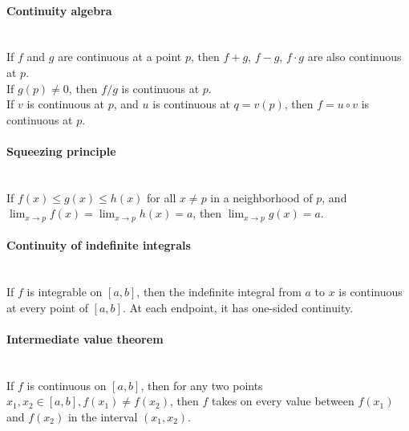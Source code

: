 \documentclass[10pt]{article}
\begin{document}
\paragraph{Continuity algebra}\ \\
If $f$ and $g$ are continuous at a point $p$, then $f + g$, $f - g$, $f \cdot g$ are also continuous at $p$.\\
If $g(p) \neq 0$, then $f/g$ is continuous at $p$.\\
If $v$ is continuous at $p$, and $u$ is continuous at $q = v(p)$,
then $f = u \circ v$ is continuous at $p$.

\paragraph{Squeezing principle}\ \\
If $f(x) \leq g(x) \leq h(x)$ for all $x \neq p$ in a neighborhood of $p$,
and $\lim_{x \to p} f(x) = \lim_{x \to p} h(x) = a$,
then $\lim_{x \to p} g(x) = a$.

\paragraph{Continuity of indefinite integrals}\ \\
If $f$ is integrable on $[a, b]$, then the indefinite integral from $a$ to $x$ is 
continuous at every point of $[a, b]$.  At each endpoint, it has one-sided continuity.

\paragraph{Intermediate value theorem}\ \\
If $f$ is continuous on $[a, b]$, then for any two points $x_1, x_2 \in [a, b], f(x_1) \neq f(x_2)$,
then $f$ takes on every value between $f(x_1)$ and $f(x_2)$ in the interval $(x_1, x_2)$.
\end{document}
